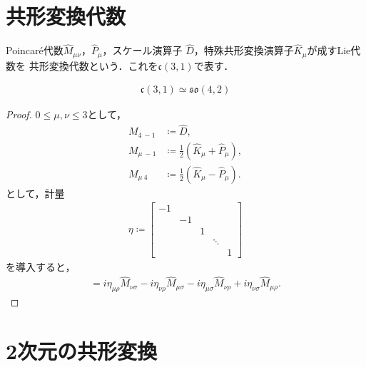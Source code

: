\section{共形変換代数}
\begin{defn}[共形変換代数]
	Poincar\'{e}代数\(\hat{M}_{\mu\nu}\)，\(\hat{P}_{\mu}\)，スケール演算子
	\(\hat{D}\)，特殊共形変換演算子\(\hat{K}_{\mu}\)が成すLie代数を
	共形変換代数という．これを\(\mathfrak{c}(3,1)\)で表す．
\end{defn}
\begin{prop}
	\begin{align}
		\mathfrak{c}(3,1)\simeq{}\mathfrak{so}(4,2)
	\end{align}
\end{prop}
\begin{proof}
	\(0\leq{}\mu,\nu\leq{}3\)として，
	\begin{align}
		M_{4\ -1}   & \coloneqq{}\hat{D},                                  \\
		M_{\mu\ -1} & \coloneqq{}\frac{1}{2}(\hat{K}_{\mu}+\hat{P}_{\mu}), \\
		M_{\mu\ 4}  & \coloneqq{}\frac{1}{2}(\hat{K}_{\mu}-\hat{P}_{\mu}).
	\end{align}
	として，計量
	\begin{align}
		\eta\coloneqq{}\begin{bmatrix}
			-1 &                     \\
			   & -1 &                \\
			   &    & 1              \\
			   &    &   & \ddots     \\
			   &    &   &        & 1
		\end{bmatrix}
	\end{align}
	を導入すると，
	\begin{align}
		[\hat{M}_{\mu\nu},\hat{M}_{\rho\sigma}]=i\eta_{\mu\rho}\hat{M}_{\nu\sigma}-i\eta_{\nu\rho}\hat{M}_{\mu\sigma}-i\eta_{\mu\sigma}\hat{M}_{\nu\rho}+i\eta_{\nu\sigma}\hat{M}_{\mu\rho}.
	\end{align}
\end{proof}
\section{2次元の共形変換}